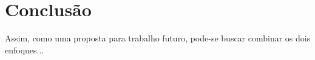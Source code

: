 
\chapter{Conclusão}

Assim, como uma proposta para trabalho futuro, pode-se buscar combinar
os dois enfoques...
